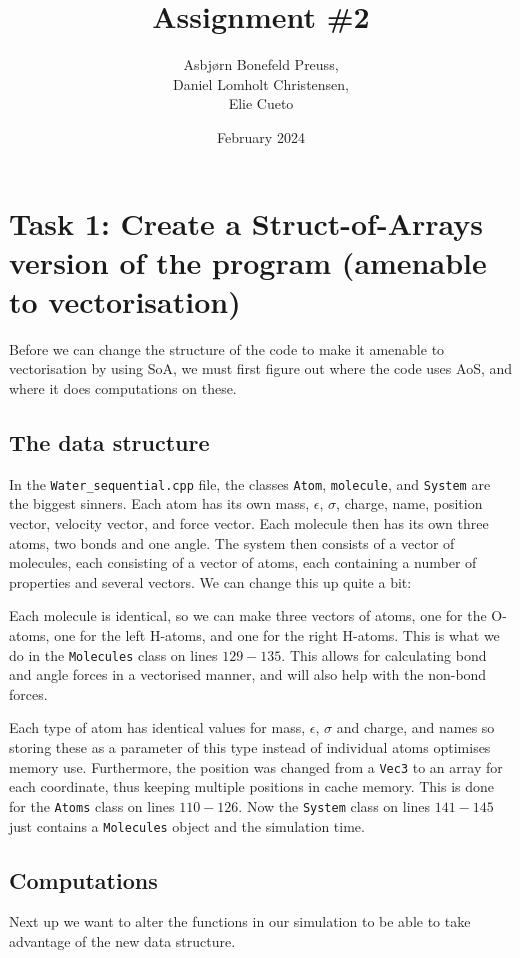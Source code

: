 \documentclass{article}
\title{Assignment \#2}
\author{Asbjørn Bonefeld Preuss,\\ Daniel Lomholt Christensen,\\ Elie Cueto}
\date{February 2024}
\begin{document}
\maketitle
\section{Task 1: Create a Struct-of-Arrays version of the program (amenable to
vectorisation)}
Before we can change the structure of the code to make it amenable to vectorisation by using SoA, we must first figure out where the code uses AoS, and where it does computations on these.

\subsection{The data structure}
In the \texttt{Water\_sequential.cpp} file, the classes \texttt{Atom}, \texttt{molecule}, and \texttt{System} are the biggest sinners. Each atom has its own mass, $\epsilon$, $\sigma$, charge, name, position vector, velocity vector, and force vector. Each molecule then has its own three atoms, two bonds and one angle. The system then consists of a vector of molecules, each consisting of a vector of atoms, each containing a number of properties and several vectors. We can change this up quite a bit: 

Each molecule is identical, so we can make three vectors of atoms, one for the O-atoms, one for the left H-atoms, and one for the right H-atoms. This is what we do in the \texttt{Molecules} class on lines $129-135$. This allows for calculating bond and angle forces in a vectorised manner, and will also help with the non-bond forces.

Each type of atom has identical values for mass, $\epsilon$, $\sigma$ and charge, and names so storing these as a parameter of this type instead of individual atoms optimises memory use. Furthermore, the position was changed from a \texttt{Vec3} to an array for each coordinate, thus keeping multiple positions in cache memory. This is done for the \texttt{Atoms} class on lines $110-126$. Now the \texttt{System} class on lines $141-145$ just contains a \texttt{Molecules} object and the simulation time.

\subsection{Computations}
Next up we want to alter the functions in our simulation to be able to take advantage of the new data structure. 
\end{document}
